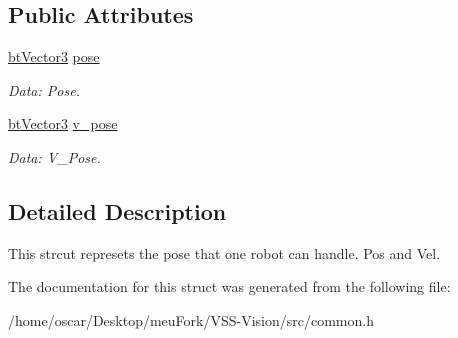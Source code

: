\subsection*{Public Attributes}
\begin{DoxyCompactItemize}
\item 
\hypertarget{structcommon_1_1Robot_a31960c8ccd21cde1ca66e263851b83ad}{\hyperlink{structcommon_1_1btVector3}{bt\-Vector3} \hyperlink{structcommon_1_1Robot_a31960c8ccd21cde1ca66e263851b83ad}{pose}}\label{structcommon_1_1Robot_a31960c8ccd21cde1ca66e263851b83ad}

\begin{DoxyCompactList}\small\item\em Data\-: Pose. \end{DoxyCompactList}\item 
\hypertarget{structcommon_1_1Robot_a8114313ba162326a4cb51ce4d5c992f2}{\hyperlink{structcommon_1_1btVector3}{bt\-Vector3} \hyperlink{structcommon_1_1Robot_a8114313ba162326a4cb51ce4d5c992f2}{v\-\_\-pose}}\label{structcommon_1_1Robot_a8114313ba162326a4cb51ce4d5c992f2}

\begin{DoxyCompactList}\small\item\em Data\-: V\-\_\-\-Pose. \end{DoxyCompactList}\end{DoxyCompactItemize}


\subsection{Detailed Description}
This strcut represets the pose that one robot can handle. Pos and Vel. 

The documentation for this struct was generated from the following file\-:\begin{DoxyCompactItemize}
\item 
/home/oscar/\-Desktop/meu\-Fork/\-V\-S\-S-\/\-Vision/src/common.\-h\end{DoxyCompactItemize}
